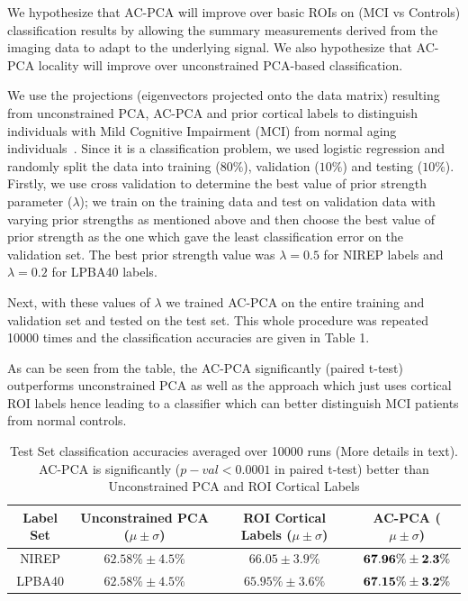 \documentclass{llncs}
\begin{document}
We hypothesize that AC-PCA will improve over basic ROIs on (MCI vs Controls) classification results by allowing the summary
measurements derived from the imaging data to adapt to the underlying signal.  We also hypothesize that AC-PCA locality will improve over
unconstrained PCA-based classification.

We use the projections (eigenvectors projected onto the data matrix) resulting from unconstrained PCA, AC-PCA and prior cortical labels to distinguish individuals with Mild Cognitive Impairment (MCI) from normal aging individuals~\cite{Zhou2011,Chen2010}. 
Since it is a classification problem, we used logistic regression and randomly split the data into training ($80\%$), validation ($10\%$) and testing ($10\%$). Firstly, we use cross validation to determine the best value of prior strength parameter ($\lambda$); we train on the training data and test on validation data with varying prior strengths as mentioned above and then choose the best value of prior strength as the one which gave the least classification error on the validation set.  The best prior strength value was $\lambda =0.5$ for NIREP labels and $\lambda=0.2$ for LPBA40 labels. 

Next, with these values of $\lambda$ we trained AC-PCA on the entire training and validation set and tested on the test set. This whole procedure was repeated 10000 times and the classification accuracies are given in Table 1.

As can be seen from the table, the AC-PCA significantly (paired t-test) outperforms unconstrained PCA as well as the approach which just uses cortical ROI labels hence leading to a classifier which can better distinguish MCI patients from normal controls. 


\begin{table}
\begin{center}
\begin{small}
\begin{tabular}{|c|c|c|c|}
\hline
 Label Set& Unconstrained PCA ($\mu\pm\sigma$) & ROI Cortical Labels ($\mu\pm\sigma$) & AC-PCA ($\mu\pm\sigma$)  \\
\hline
 NIREP& $62.58\% \pm 4.5\%$&$66.05\pm 3.9\%$ &${\bf 67.96\%\pm 2.3\%}$\\
 LPBA40&$62.58\% \pm 4.5\%$&$65.95\%\pm3.6\%$ &${\bf 67.15\%\pm 3.2\%}$\\ 
   \hline
\end{tabular}
\end{small}
\vspace{0.1in}
\caption{Test Set classification accuracies averaged over 10000 runs (More details in text). AC-PCA is significantly ($p-val <0.0001$ in paired t-test) better than Unconstrained PCA and ROI Cortical Labels}
\end{center}
\end{table}
\end{document}
